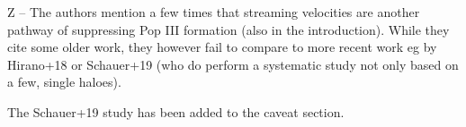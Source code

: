 \documentclass[11pt]{article}
\newenvironment{referee}[1][]{%
    \ignorespaces%
    \begin{mdframed}[style=myquotestyle,#1]%
}{%
    \end{mdframed}%
    \ignorespacesafterend%
}%
\begin{document}
\begin{referee}
Z -- The authors mention a few times that streaming velocities are another pathway of suppressing Pop III formation (also in the introduction). While they cite some older work, they however fail to compare to more recent work eg by Hirano+18 or Schauer+19 (who do perform a systematic study not only based on a few, single haloes).
\end{referee}
The Schauer+19 study has been added to the caveat section.
\end{document}
